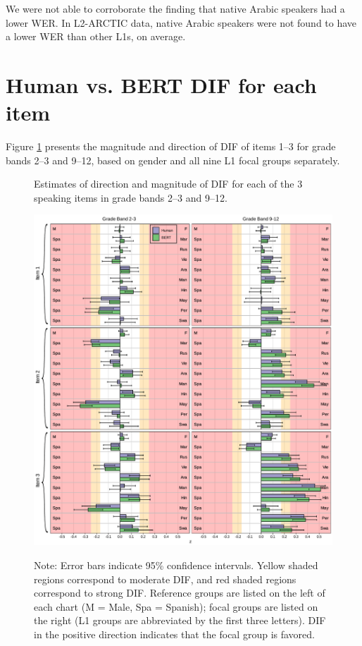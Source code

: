 \documentclass [PhD] {uclathes}
\begin{document}
We were not able to corroborate the finding that native Arabic speakers had a lower WER. In L2-ARCTIC data, native Arabic speakers were not found to have a lower WER than other L1s, on average. 

\section{Human vs. BERT DIF for each item}
\label{sec:appendix_z_itm}

Figure \ref{fig:z_itm} presents the magnitude and direction of DIF of items 1–3 for grade bands 2–3 and 9–12, based on gender and all nine L1 focal groups separately.

\begin{figure}[t]
    \centering
    \caption{Estimates of direction and magnitude of DIF for each of the 3 speaking items in grade bands 2–3 and 9–12.}
    \includegraphics[width=6in]{figures/20230504_ETS-DIF_BERT_z_itm_edit.pdf}
    \label{fig:z_itm}
\caption*{\small Note: Error bars indicate 95\% confidence intervals. Yellow shaded regions correspond to moderate DIF, and red shaded regions correspond to strong DIF. Reference groups are listed on the left of each chart (M = Male, Spa = Spanish); focal groups are listed on the right (L1 groups are abbreviated by the first three letters). DIF in the positive direction indicates that the focal group is favored.}
\end{figure}
\end{document}
